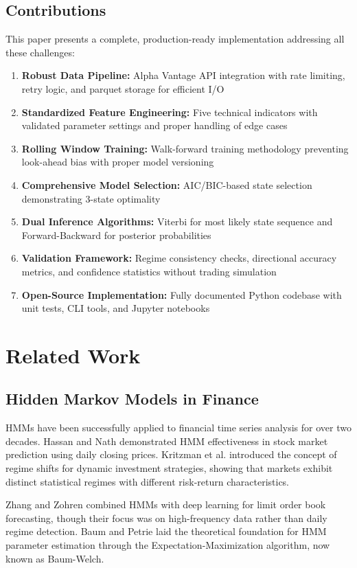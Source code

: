 \documentclass[conference]{IEEEtran}
\begin{document}
\subsection{Contributions}
This paper presents a complete, production-ready implementation addressing all these challenges:
\begin{enumerate}
\item \textbf{Robust Data Pipeline:} Alpha Vantage API integration with rate limiting, retry logic, and parquet storage for efficient I/O
\item \textbf{Standardized Feature Engineering:} Five technical indicators with validated parameter settings and proper handling of edge cases
\item \textbf{Rolling Window Training:} Walk-forward training methodology preventing look-ahead bias with proper model versioning
\item \textbf{Comprehensive Model Selection:} AIC/BIC-based state selection demonstrating 3-state optimality
\item \textbf{Dual Inference Algorithms:} Viterbi for most likely state sequence and Forward-Backward for posterior probabilities
\item \textbf{Validation Framework:} Regime consistency checks, directional accuracy metrics, and confidence statistics without trading simulation
\item \textbf{Open-Source Implementation:} Fully documented Python codebase with unit tests, CLI tools, and Jupyter notebooks
\end{enumerate}

\section{Related Work}

\subsection{Hidden Markov Models in Finance}
HMMs have been successfully applied to financial time series analysis for over two decades. Hassan and Nath \cite{hassan2005} demonstrated HMM effectiveness in stock market prediction using daily closing prices. Kritzman et al. \cite{kritzman2012} introduced the concept of regime shifts for dynamic investment strategies, showing that markets exhibit distinct statistical regimes with different risk-return characteristics.

Zhang and Zohren \cite{zhang2019} combined HMMs with deep learning for limit order book forecasting, though their focus was on high-frequency data rather than daily regime detection. Baum and Petrie \cite{baum1966} laid the theoretical foundation for HMM parameter estimation through the Expectation-Maximization algorithm, now known as Baum-Welch.
\end{document}
